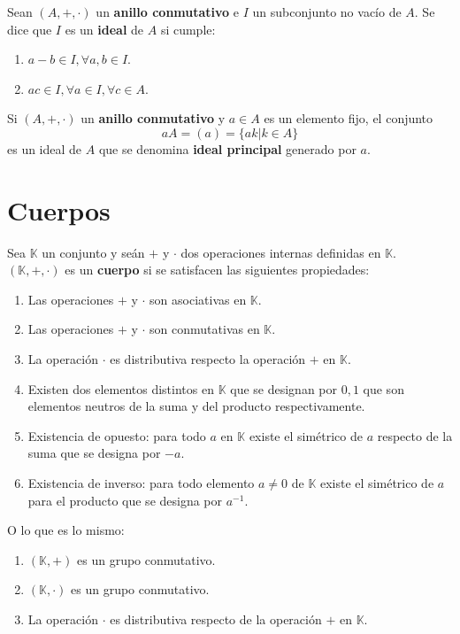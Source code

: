 Sean $(A,+,\cdot)$ un \textbf{anillo conmutativo} e $I$ un subconjunto no vacío de $A$. Se dice que $I$ es un \textbf{ideal} de $A$ si cumple:
\begin{enumerate}
\item $a-b \in I, \forall a,b \in I$.
\item $ac \in I, \forall a \in I, \forall c \in A$.
\end{enumerate}

Si $(A,+,\cdot)$ un \textbf{anillo conmutativo} y $a \in A$ es un elemento fijo, el conjunto
\[
aA = (a) = \{ak | k \in A\}
\]
es un ideal de $A$ que se denomina \textbf{ideal principal} generado por $a$.

\section{Cuerpos}

Sea $\mathbb{K}$ un conjunto y seán $+$ y $\cdot$ dos operaciones internas definidas en $\mathbb{K}$. $(\mathbb{K},+,\cdot)$ es un \textbf{cuerpo} si se satisfacen las siguientes propiedades:
\begin{enumerate}
  \item Las operaciones $+$ y $\cdot$ son asociativas en $\mathbb{K}$.
  \item Las operaciones $+$ y $\cdot$ son conmutativas en $\mathbb{K}$.
  \item La operación $\cdot$ es distributiva respecto la operación $+$ en $\mathbb{K}$.
  \item Existen dos elementos distintos en $\mathbb{K}$ que se designan por $0,1$ que son elementos neutros de la suma y del producto respectivamente.
  \item Existencia de opuesto: para todo $a$ en $\mathbb{K}$ existe el simétrico de $a$ respecto de la suma que se designa por $-a$.
  \item Existencia de inverso: para todo elemento $a \neq 0$ de $\mathbb{K}$ existe el simétrico de $a$ para el producto que se designa por $a^{-1}$.
\end{enumerate}
O lo que es lo mismo:
\begin{enumerate}
  \item $(\mathbb{K},+)$ es un grupo conmutativo.
  \item $(\mathbb{K},\cdot)$ es un grupo conmutativo.
  \item La operación $\cdot$ es distributiva respecto de la operación $+$ en $\mathbb{K}$.
\end{enumerate}

